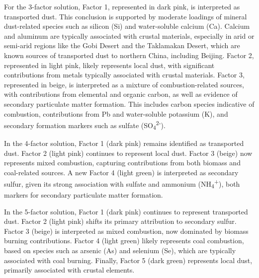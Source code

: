 \documentclass[
  letterpaper,
  DIV=11,
  numbers=noendperiod]{scrartcl}
\begin{document}
For the 3-factor solution, Factor 1, represented in dark pink, is
interpreted as transported dust. This conclusion is supported by
moderate loadings of mineral dust-related species such as silicon (Si)
and water-soluble calcium (Ca). Calcium and aluminum are typically
associated with crustal materials, especially in arid or semi-arid
regions like the Gobi Desert and the Taklamakan Desert, which are known
sources of transported dust to northern China, including Beijing. Factor
2, represented in light pink, likely represents local dust, with
significant contributions from metals typically associated with crustal
materials. Factor 3, represented in beige, is interpreted as a mixture
of combustion-related sources, with contributions from elemental and
organic carbon, as well as evidence of secondary particulate matter
formation. This includes carbon species indicative of combustion,
contributions from Pb and water-soluble potassium (K), and secondary
formation markers such as sulfate
(SO\textsubscript{4}\textsuperscript{2-}).

In the 4-factor solution, Factor 1 (dark pink) remains identified as
transported dust. Factor 2 (light pink) continues to represent local
dust. Factor 3 (beige) now represents mixed combustion, capturing
contributions from both biomass and coal-related sources. A new Factor 4
(light green) is interpreted as secondary sulfur, given its strong
association with sulfate and ammonium
(NH\textsubscript{4}\textsuperscript{+}), both markers for secondary
particulate matter formation.

In the 5-factor solution, Factor 1 (dark pink) continues to represent
transported dust. Factor 2 (light pink) shifts its primary attribution
to secondary sulfur. Factor 3 (beige) is interpreted as mixed
combustion, now dominated by biomass burning contributions. Factor 4
(light green) likely represents coal combustion, based on species such
as arsenic (As) and selenium (Se), which are typically associated with
coal burning. Finally, Factor 5 (dark green) represents local dust,
primarily associated with crustal elements.
\end{document}
